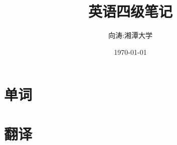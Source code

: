 \documentclass[UTF8]{ctexart}
\title{英语四级笔记}
\author{向涛:湘潭大学}
\date{\today}
\begin{document}
\maketitle

\section{单词}

\section{翻译}
\end{document}
